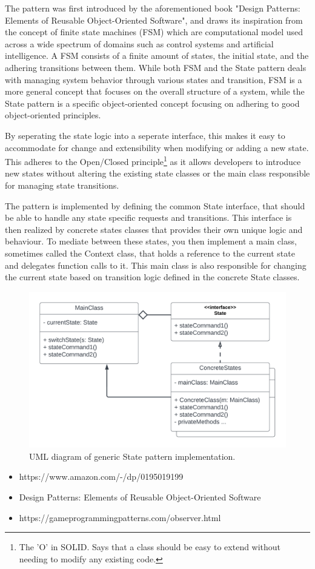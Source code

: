     The pattern was first introduced by the aforementioned book "Design Patterns: Elements of Reusable Object-Oriented Software", and draws its inspiration from the concept of finite state machines (FSM) which are computational model used across a wide spectrum of domains such as control systems and artificial intelligence. A FSM consists of a finite amount of states, the initial state, and the adhering transitions between them. While both FSM and the State pattern deals with managing system behavior through various states and transition, FSM is a more general concept that focuses on the overall structure of a system, while the State pattern is a specific object-oriented concept focusing on adhering to good object-oriented principles.

    By seperating the state logic into a seperate interface, this makes it easy to accommodate for change and extensibility when modifying or adding a new state. This adheres to the Open/Closed principle\footnote{The 'O' in SOLID. Says that a class should be easy to extend without needing to modify any existing code.} as it allows developers to introduce new states without altering the existing state classes or the main class responsible for managing state transitions.

    The pattern is implemented by defining the common State interface, that should be able to handle any state specific requests and transitions. This interface is then realized by concrete states classes that provides their own unique logic and behaviour. To mediate between these states, you then implement a main class, sometimes called the Context class, that holds a reference to the current state and delegates function calls to it. This main class is also responsible for changing the current state based on transition logic defined in the concrete State classes.
    
    \begin{figure}[H]
      \centering
      \includegraphics[scale=0.75]{Project_report/figures/theory/design_patterns/state_uml.png}
      \caption{UML diagram of generic State pattern implementation.}
      \label{fig:observer_uml}
    \end{figure}

    \vspace{50pt}
    \begin{itemize}
        \item https://www.amazon.com/-/dp/0195019199
        \item Design Patterns: Elements of Reusable Object-Oriented Software
        \item https://gameprogrammingpatterns.com/observer.html
    \end{itemize}


